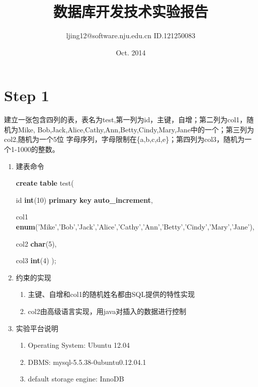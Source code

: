 \documentclass[UTF8]{ctexart}
\title{数据库开发技术实验报告}
\author{ljing12@software.nju.edu.cn ID.121250083 }
\date{Oct. 2014}
\begin{document}
\maketitle
\section{Step 1}

建立一张包含四列的表，表名为test,第一列为id，主键，自增；第二列为col1，随机为Mike,
Bob,Jack,Alice,Cathy,Ann,Betty,Cindy,Mary,Jane中的一个；第三列为col2,随机为一个5位
字母序列，字母限制在\{a,b,c,d,e\}；第四列为col3，随机为一个1-1000的整数。
    \begin{enumerate}
        \item 建表命令
        
        \textbf{create} \textbf{table} test(
        
        id \textbf{int}(10) \textbf{primary} \textbf{key} \textbf{auto\_increment},
        
        col1 \textbf{enum}('Mike','Bob','Jack','Alice','Cathy','Ann','Betty','Cindy','Mary','Jane'),

        col2 \textbf{char}(5),

        col3 \textbf{int}(4)
        );
        \item 约束的实现
        \begin{enumerate}
            \item 主键、自增和col1的随机姓名都由SQL提供的特性实现
            \item col2由高级语言实现，用java对插入的数据进行控制
        \end{enumerate}
        \item 实验平台说明
        \begin{enumerate}
            \item Operating System: Ubuntu 12.04
            \item DBMS: mysql-5.5.38-0ubuntu0.12.04.1
            \item default storage engine: InnoDB
        \end{enumerate}
    \end{enumerate}
\end{document}
